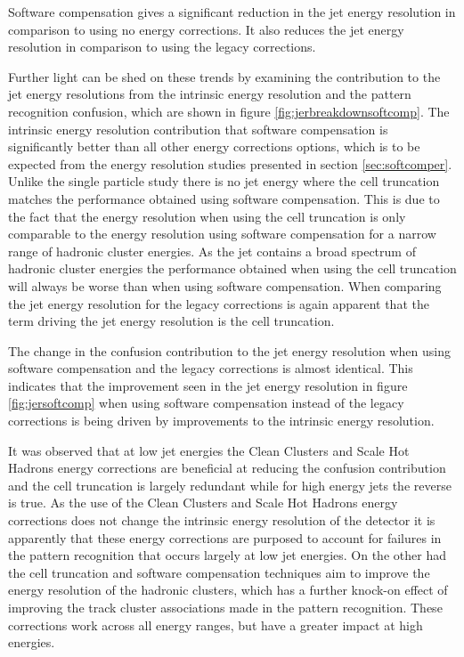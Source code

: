 Software compensation gives a significant reduction in the jet energy resolution in comparison to using no energy corrections.  It also reduces the jet energy resolution in comparison to using the legacy corrections.  

Further light can be shed on these trends by examining the contribution to the jet energy resolutions from the intrinsic energy resolution and the pattern recognition confusion, which are shown in figure \ref{fig:jerbreakdownsoftcomp}.  The intrinsic energy resolution contribution that software compensation is significantly better than all other energy corrections options, which is to be expected from the energy resolution studies presented in section \ref{sec:softcomper}.  Unlike the single particle study there is no jet energy where the cell truncation matches the performance obtained using software compensation.  This is due to the fact that the energy resolution when using the cell truncation is only comparable to the energy resolution using software compensation for a narrow range of hadronic cluster energies.  As the jet contains a broad spectrum of hadronic cluster energies the performance obtained when using the cell truncation will always be worse than when using software compensation.  When comparing the jet energy resolution for the legacy corrections is again apparent that the term driving the jet energy resolution is the cell truncation.

The change in the confusion contribution to the jet energy resolution when using software compensation and the legacy corrections is almost identical.  This indicates that the improvement seen in the jet energy resolution in figure \ref{fig:jersoftcomp} when using software compensation instead of the legacy corrections is being driven by improvements to the intrinsic energy resolution.  

It was observed that at low jet energies the Clean Clusters and Scale Hot Hadrons energy corrections are beneficial at reducing the confusion contribution and the cell truncation is largely redundant while for high energy jets the reverse is true.  As the use of the Clean Clusters and Scale Hot Hadrons energy corrections does not change the intrinsic energy resolution of the detector it is apparently that these energy corrections are purposed to account for failures in the pattern recognition that occurs largely at low jet energies.  On the other had the cell truncation and software compensation techniques aim to improve the energy resolution of the hadronic clusters, which has a further knock-on effect of improving the track cluster associations made in the pattern recognition.  These corrections work across all energy ranges, but have a greater impact at high energies.  

